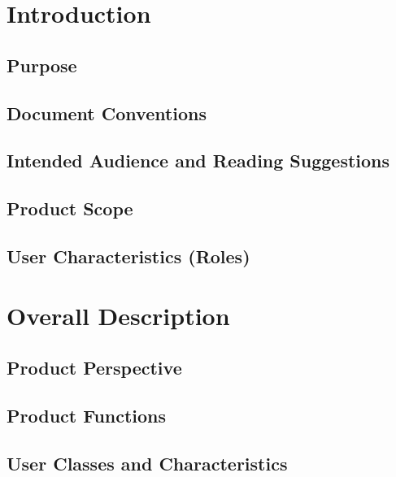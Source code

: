     \chapter{Introduction}\label{ch:Introduction}
        \section{Purpose}
            
        \section{Document Conventions}
            
        \section{Intended Audience and Reading Suggestions}
            
        \section{Product Scope}
            
        \section{User Characteristics (Roles)}
            
    
    \newpage
    \chapter{Overall Description}\label{ch:Overall Description}
        \section{Product Perspective}   
            
        \section{Product Functions}
            
        \section{User Classes and Characteristics}
            
